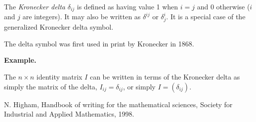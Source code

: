 \documentclass[12pt]{article}
\begin{document}
The \emph{Kronecker delta} $\delta_{ij}$ is defined as having value 1 when $i=j$ and 0 otherwise ($i$ and $j$ are integers).  It may also be written as $\delta^{ij}$ or  $\delta^i_j$.  It is a special case of the generalized Kronecker delta symbol.

The delta symbol was first used in print by Kronecker in 1868\cite{Higham}. 

{\bf Example.}

The $n \times n$ identity matrix $I$ can be written in terms of the Kronecker delta as simply the matrix of the delta, $I_{ij}=\delta_{ij}$, or simply $I=(\delta_{ij})$.

\begin{thebibliography}{3}
 N. Higham, Handbook of writing for the mathematical sciences, Society for Industrial and Applied Mathematics, 1998. 
\end{thebibliography}
\end{document}
